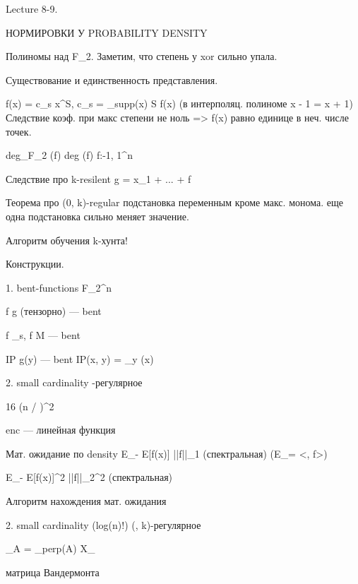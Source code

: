 Lecture 8-9.


НОРМИРОВКИ У PROBABILITY DENSITY


Полиномы над F_2. Заметим, что степень у xor сильно упала.

Существование и единственность представления.


f(x) = \sum c_s x^S,    c_s = \sum\limits_{supp(x) \in S} f(x)   (в интерполяц. полиноме x - 1 = x + 1)
Следствие коэф. при макс степени не ноль => f(x) равно единице в неч. числе точек.


deg_{F_2} (f) \le deg (f)  f:{-1, 1}^n 

Следствие про k-resilent
g = x_1 + ... + f


Теорема про (0, k)-regular
подстановка переменным кроме макс. монома. еще одна подстановка сильно меняет значение.





Алгоритм обучения k-хунта!





Конструкции.

1. bent-functions F_2^n 

f g (тензорно) --- bent

f \chi_s, f M --- bent

IP g(y) --- bent  IP(x, y) = \chi_y (x) 


2. small cardinality \eps-регулярное

16 (n / \eps)^2

enc --- линейная функция




Мат. ожидание по \eps density
E_\phi [f(x)] - E[f(x)] \le \eps ||f||_1 (спектральная)
(E_\phi [f(x)] = <\phi, f>)

E_\phi [f^2(x)] - E[f(x)]^2 \le \eps ||f||_2^2 (спектральная)

Алгоритм нахождения мат. ожидания


2. small cardinality (log(n)!) (\eps, k)-регулярное

\phi_A = \sum\limits_{\gamma \in perp(A)} X_{\gamma}

матрица Вандермонта
